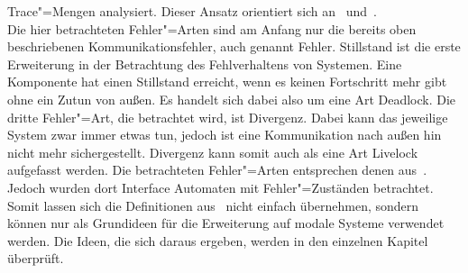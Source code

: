 Trace"=Mengen analysiert. Dieser Ansatz orientiert sich an~\cite{Vogler2014EIO}
und~\cite{Schinko2016BA}.\\
Die hier betrachteten Fehler"=Arten sind am Anfang nur die bereits oben
beschriebenen Kommunikationsfehler, auch genannt Fehler. Stillstand ist die
erste Erweiterung in der Betrachtung des Fehlverhaltens von Systemen. Eine
Komponente hat einen Stillstand erreicht, wenn es keinen Fortschritt mehr gibt
ohne ein Zutun von außen. Es handelt sich dabei also um eine Art Deadlock. Die
dritte Fehler"=Art, die betrachtet wird, ist Divergenz. Dabei kann das
jeweilige System zwar immer etwas tun, jedoch ist eine Kommunikation nach außen
hin nicht mehr sichergestellt. Divergenz kann somit auch als eine Art Livelock
aufgefasst werden. Die betrachteten Fehler"=Arten entsprechen denen
aus~\cite{Schinko2016BA}. Jedoch wurden dort Interface Automaten mit
Fehler"=Zuständen betrachtet. Somit lassen sich die Definitionen
aus~\cite{Schinko2016BA} nicht einfach übernehmen, sondern können nur als
Grundideen für die Erweiterung auf modale Systeme verwendet werden. Die Ideen,
die sich daraus ergeben, werden in den einzelnen Kapitel überprüft.
